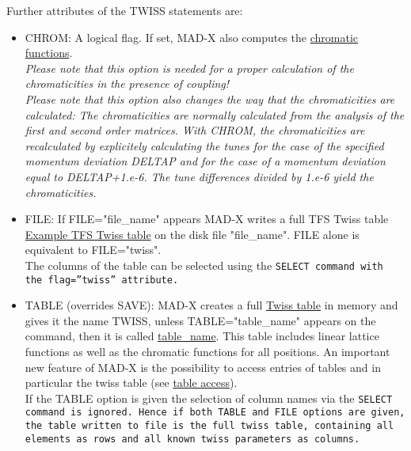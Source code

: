 Further attributes of the TWISS statements are: 
\begin{itemize}

   \item CHROM: A logical flag. If set, MAD-X also computes the
     \href{../Introduction/tables.html#chrom}{chromatic
       functions}.  \\
     \textit{Please note that this option is needed for a proper
       calculation of the chromaticities in the presence of coupling!}\\
     \textit{Please note that this option also changes the way that the
       chromaticities are calculated: The chromaticities are normally
       calculated from the analysis of the first and second order
       matrices. With CHROM, the chromaticities are recalculated by
       explicitely calculating the tunes for the case of the specified momentum
       deviation DELTAP and for the case of a momentum deviation equal
       to DELTAP+1.e-6. The tune differences divided by 1.e-6 yield the
       chromaticities.}

   \item FILE: If FILE="file\_name" appears MAD-X writes a full TFS
     Twiss table \href{../Introduction/select.html#tfs}{Example TFS
       Twiss table} on the disk file "file\_name". FILE alone is
     equivalent to FILE="twiss".\\
     The columns of the table can be selected using the \tt{SELECT}
     command with the \tt{flag=''twiss''} attribute. 

   \item TABLE (overrides SAVE): MAD-X creates a full
     \href{../Introduction/tables.html#linear}{Twiss table} in
     memory and gives it the name TWISS, unless TABLE="table\_name"
     appears on the command, then it is called
     \href{../Introduction/label.html}{table\_name}. This table
     includes linear lattice functions as well as the chromatic
     functions for all positions. An important new feature of MAD-X
     is the possibility to access entries of tables and in
     particular the twiss table (see
     \href{../Introduction/expression.html#table}{table access}).\\
     If the TABLE option is given the selection of column names via the
     \tt{SELECT} command is ignored. Hence if both \tt{TABLE} and
     \tt{FILE} options are given, the table written to file is the full
     twiss table, containing all elements as rows and all known twiss 
     parameters as columns. 


\end{itemize}
